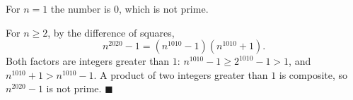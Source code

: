 For $n=1$ the number is $0$, which is not prime.

For $n\ge2$, by the difference of squares,
\[n^{2020}-1=\left(n^{1010}-1\right)\left(n^{1010}+1\right).\]
Both factors are integers greater than $1$: $n^{1010}-1\ge2^{1010}-1>1$, and $n^{1010}+1>n^{1010}-1$. A product of two integers greater than $1$ is composite, so $n^{2020}-1$ is not prime. $\blacksquare$

